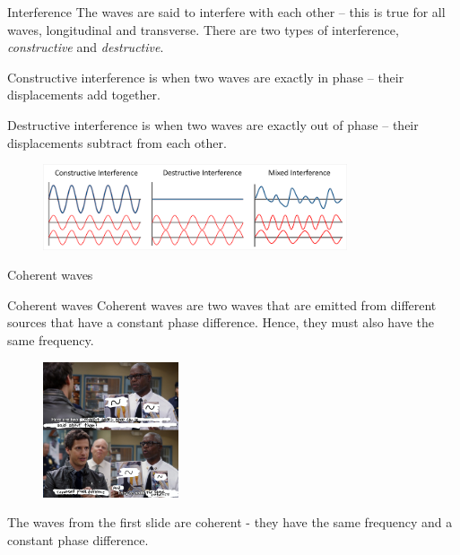 \documentclass[../Main.tex]{subfiles}
\begin{document}
\begin{frame}{Interference}
     The waves are said to interfere with each other -- this is true for all waves, longitudinal and transverse. There are two types of interference, \emph{constructive} and \emph{destructive}.
    \pause
    \begin{multicols}{2}
    Constructive interference is when two waves are exactly in phase -- their displacements add together.
    \pause
    \columnbreak

    Destructive interference is when two waves are exactly out of phase -- their displacements subtract from each other.
    \end{multicols}
    
    \begin{figure}
        \centering
        \includegraphics[width=0.8\textwidth]{Waves_Images/interference.png}
    \end{figure}
\end{frame}

\begin{frame}{Coherent waves}
    \begin{block}{Coherent waves}
    Coherent waves are two waves that are emitted from different sources that have a constant phase difference. Hence, they must also have the same frequency. 
    \end{block}
    \begin{figure}
        \centering
        \includegraphics[width=4cm]{Waves_Images/coherentwavesmeme.png}
    \end{figure}
    The waves from the first slide are coherent - they have the same frequency and a constant phase difference.
\end{frame}
\end{document}
